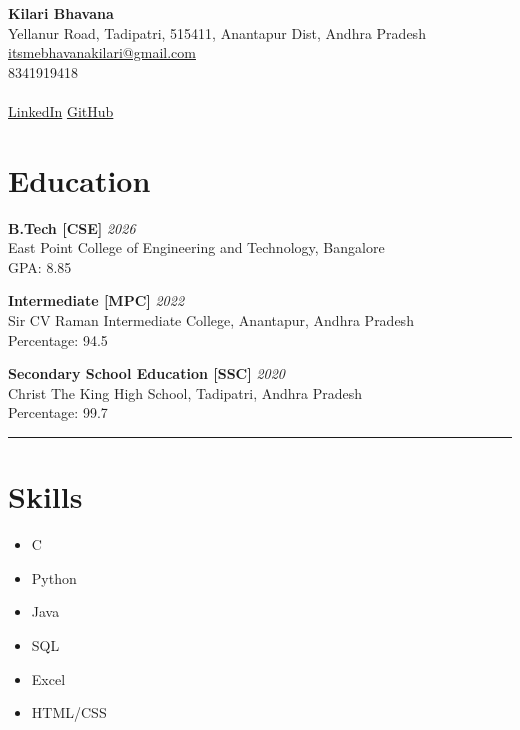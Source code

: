 \documentclass[a4paper,10pt]{article}
\begin{document}
 

\begin{center} 
    \textbf{\LARGE Kilari Bhavana}\\ 
    \vspace{0.5em} 
    Yellanur Road, Tadipatri, 515411, Anantapur Dist, Andhra Pradesh  \\
    \href{mailto:itsmebhavanakilari@gmail.com}{itsmebhavanakilari@gmail.com} \\
    8341919418 \\
    \hrulefill \\[0.4em]
    \small{\href{https://www.linkedin.com/in/bhavana-kilari-5537392a2}{LinkedIn} \textbar{} \href{https://github.com/BhavanaKilari}{GitHub}} 
\end{center}

\vspace{1em}

\section*{Education} 
\noindent\textbf{B.Tech [CSE]} \hfill \textit{2026} \\
East Point College of Engineering and Technology, Bangalore \\
GPA: 8.85

\vspace{0.5em}
\noindent\textbf{Intermediate [MPC]} \hfill \textit{2022} \\
Sir CV Raman Intermediate College, Anantapur, Andhra Pradesh\\
Percentage: 94.5%

\vspace{0.5em}
\noindent\textbf{Secondary School Education [SSC]} \hfill \textit{2020} \\
Christ The King High School, Tadipatri, Andhra Pradesh\\
Percentage: 99.7%

\noindent\rule{16cm}{0.4pt}

\vspace{1em}

\section*{Skills} 
\begin{itemize}[left=0pt, label=\textbullet, labelsep=1em]
    \item C
    \item Python
    \item Java
    \item SQL
    \item Excel
    \item HTML/CSS
\end{itemize}
\end{document}
